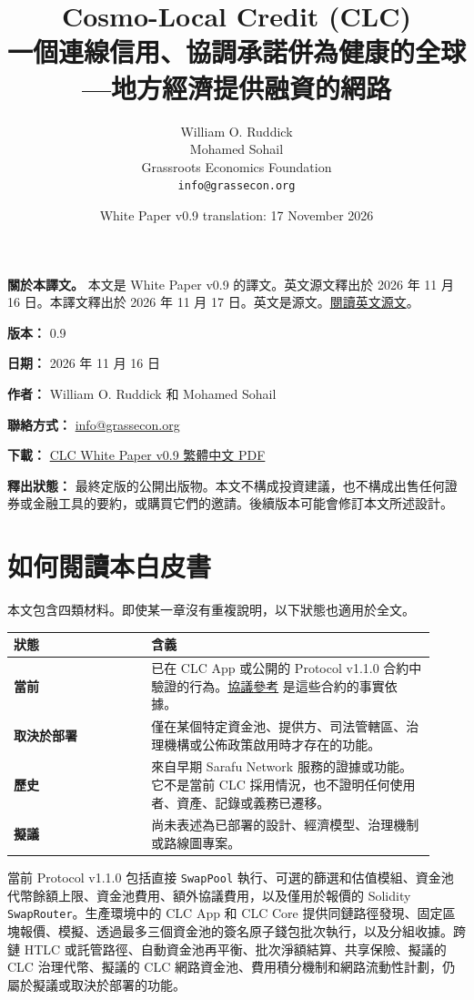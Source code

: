 \documentclass[11pt]{article}
\title{Cosmo-Local Credit (CLC)\\一個連線信用、協調承諾併為健康的全球---地方經濟提供融資的網路}
\author{William O. Ruddick \\ Mohamed Sohail \\ Grassroots Economics Foundation \\ \texttt{info@grassecon.org}}
\date{White Paper v0.9 translation: 17 November 2026}
\begin{document}
\maketitle
\tableofcontents
\newpage
\sloppy
\RaggedRight

\textbf{關於本譯文。} 本文是 White Paper v0.9 的譯文。英文源文釋出於 2026 年 11 月 16 日。本譯文釋出於 2026 年 11 月 17 日。英文是源文。\href{https://docs.cosmolocal.credit/white-paper}{閱讀英文源文}。

\textbf{版本：} 0.9

\textbf{日期：} 2026 年 11 月 16 日

\textbf{作者：} William O. Ruddick 和 Mohamed Sohail

\textbf{聯絡方式：} \href{mailto:info@grassecon.org}{info@grassecon.org}

\textbf{下載：} \href{https://docs.cosmolocal.credit/white-paper/Cosmo-Local-Credit-CLC-White-Paper-v9-zh-Hant.pdf}{CLC White Paper v0.9 繁體中文 PDF}

\textbf{釋出狀態：} 最終定版的公開出版物。本文不構成投資建議，也不構成出售任何證券或金融工具的要約，或購買它們的邀請。後續版本可能會修訂本文所述設計。

\section*{如何閱讀本白皮書}

本文包含四類材料。即使某一章沒有重複說明，以下狀態也適用於全文。

\begin{longtable}{P{0.30\linewidth} P{0.62\linewidth}}
\toprule
狀態 & 含義 \\
\midrule
\endhead
\textbf{當前} & 已在 CLC App 或公開的 Protocol v1.1.0 合約中驗證的行為。\href{https://docs.cosmolocal.credit/zh-Hant/protocol/overview}{協議參考} 是這些合約的事實依據。 \\
\textbf{取決於部署} & 僅在某個特定資金池、提供方、司法管轄區、治理機構或公佈政策啟用時才存在的功能。 \\
\textbf{歷史} & 來自早期 Sarafu Network 服務的證據或功能。它不是當前 CLC 採用情況，也不證明任何使用者、資產、記錄或義務已遷移。 \\
\textbf{擬議} & 尚未表述為已部署的設計、經濟模型、治理機制或路線圖專案。 \\
\bottomrule
\end{longtable}

當前 Protocol v1.1.0 包括直接 \texttt{SwapPool} 執行、可選的篩選和估值模組、資金池代幣餘額上限、資金池費用、額外協議費用，以及僅用於報價的 Solidity \texttt{SwapRouter}。生產環境中的 CLC App 和 CLC Core 提供同鏈路徑發現、固定區塊報價、模擬、透過最多三個資金池的簽名原子錢包批次執行，以及分組收據。跨鏈 HTLC 或託管路徑、自動資金池再平衡、批次淨額結算、共享保險、擬議的 CLC 治理代幣、擬議的 CLC 網路資金池、費用積分機制和網路流動性計劃，仍屬於擬議或取決於部署的功能。
\end{document}
